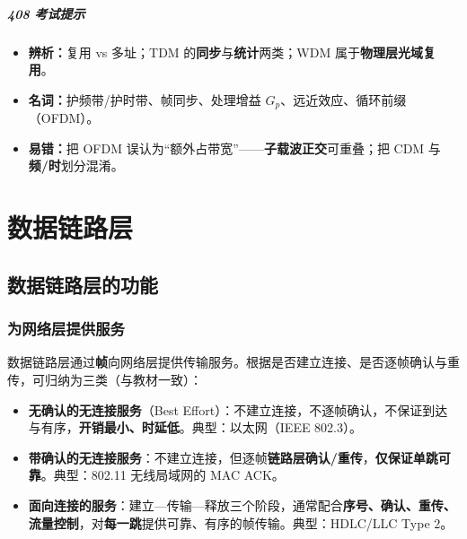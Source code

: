 \documentclass[lang=cn,newtx,10pt,scheme=chinese]{../../elegantbook}
\begin{document}
\paragraph{408 考试提示}
\begin{itemize}
    \item \textbf{辨析：}复用 vs 多址；TDM 的\textbf{同步}与\textbf{统计}两类；WDM 属于\textbf{物理层光域复用}。
    \item \textbf{名词：}护频带/护时带、帧同步、处理增益 $G_p$、远近效应、循环前缀（OFDM）。
    \item \textbf{易错：}把 OFDM 误认为“额外占带宽”——\textbf{子载波正交}可重叠；把 CDM 与\textbf{频/时}划分混淆。
\end{itemize}



\chapter{数据链路层}

\section{数据链路层的功能}
\subsection{为网络层提供服务}
数据链路层通过\textbf{帧}向网络层提供传输服务。根据是否建立连接、是否逐帧确认与重传，可归纳为三类（与教材一致）：
\begin{itemize}
    \item \textbf{无确认的无连接服务}（Best Effort）：不建立连接，不逐帧确认，不保证到达与有序，\textbf{开销最小、时延低}。典型：以太网（IEEE 802.3）。
    \item \textbf{带确认的无连接服务}：不建立连接，但逐帧\textbf{链路层确认/重传}，\textbf{仅保证单跳可靠}。典型：802.11 无线局域网的 MAC ACK。
    \item \textbf{面向连接的服务}：建立—传输—释放三个阶段，通常配合\textbf{序号、确认、重传、流量控制}，对\textbf{每一跳}提供可靠、有序的帧传输。典型：HDLC/LLC Type 2。
\end{itemize}
\end{document}
